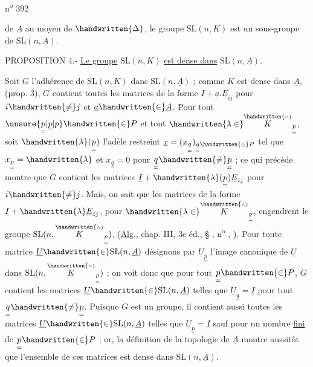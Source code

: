 \hfill n\textsuperscript{o} 392

de $\underline{A}$ au moyen de $\handwritten{\Delta}$, le groupe $\mathrm{SL}(n,K)$ est un sous-groupe de $\mathrm{SL}(n,\underline{A})$.

PROPOSITION 4.- \uline{Le groupe} $\mathrm{SL}(n,K)$ \uline{est dense dans} $\mathrm{SL}(n,\underline{A})$.

Soit $G$ l'adhérence de $\mathrm{SL}(n,K)$ dans $\mathrm{SL}(n,\underline{A})$ ; comme $K$ est dense dans $\underline{A}$, (prop. 3), $G$ contient toutes les matrices de la forme $\underline{I}+\underline{a}.\underline{E}_{ij}$ pour $i\handwritten{\ne}j$ et $\underline{a}\handwritten{\in}\underline{A}$. Pour tout $\unsure{\underset{=}{p}|\underline{p}|p}\handwritten{\in}P$ et tout $\handwritten{\lambda\in}\overset{\handwritten{\scriptscriptstyle\wedge}}{K}_{\underset{=}{p}}$, soit $\handwritten{\lambda}(\underset{=}{p})$ l'adèle restreint $\underline{x}=(x_{\underset{=}{q}})_{\underset{=}{q}\handwritten{\in}P}$ tel que $x_{\underset{=}{p}}=\handwritten{\lambda}$ et $x_{\underset{=}{q}}=0$ pour $\underset{=}{q}\handwritten{\ne}\underset{=}{p}$ ; ce qui précède montre que $G$ contient les matrices $\underline{I}+\handwritten{\lambda}(\underset{=}{p})\underline{E}_{ij}$ pour $i\handwritten{\ne}j$. Mais, on sait que les matrices de la forme $\underline{I}+\handwritten{\lambda}\underline{E}_{ij}$, pour $\handwritten{\lambda\in}\overset{\handwritten{\scriptscriptstyle\wedge}}{K}_{\underset{=}{p}}$, engendrent le groupe $\mathrm{SL}(n,\overset{\handwritten{\scriptscriptstyle\wedge}}{K}_{\underset{=}{p}})$, (\uline{Alg}., chap. III, 3e éd., § \hspace{1em}, n\textsuperscript{o} \hspace{1em}, \hspace{1.7em}). Pour toute matrice $\underline{U}\handwritten{\in}\mathrm{SL}(n,\underline{A})$ désignons par $\underline{U}_{\underset{=}{p}}$ l'image canonique de $\underline{U}$ dans $\mathrm{SL}(n,\overset{\handwritten{\scriptscriptstyle\wedge}}{K}_{\underset{=}{p}})$ ; on voit donc que pour tout $\underset{=}{p}\handwritten{\in}P$, $G$ contient les matrices $\underline{U}\handwritten{\in}\mathrm{SL}(n,\underline{A})$ telles que $\underline{U}_{\underset{=}{q}}=\underline{I}$ pour tout $\underset{=}{q}\handwritten{\ne}\underset{=}{p}$. Puisque $G$ est un groupe, il contient aussi toutes les matrices $\underline{U}\handwritten{\in}\mathrm{SL}(n,\underline{A})$ telles que $\underline{U}_{\underset{=}{p}}=\underline{I}$ sauf pour un nombre \uline{fini} de $\underset{=}{p}\handwritten{\in}P$ ; or, la définition de la topologie de $\underline{A}$ montre aussitôt que l'ensemble de ces matrices est dense dans $\mathrm{SL}(n,\underline{A})$.

